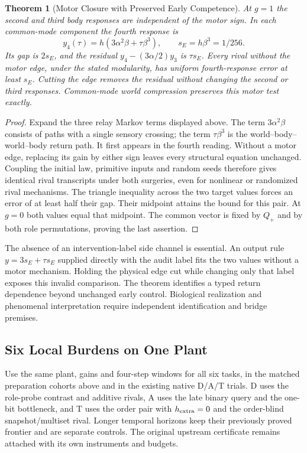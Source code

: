 \documentclass[11pt,a4paper]{article}
\newtheorem{theorem}{Theorem}[section]
\theoremstyle{definition}
\begin{document}
\begin{theorem}[Motor Closure with Preserved Early Competence]\label{thm:bridge-motor-closure}
At $g=1$ the second and third body responses are independent of the motor sign. In each common-mode component the fourth response is
\[
 y_4(\tau)=h(3\alpha^2\beta+\tau\beta^3),\qquad s_E=h\beta^3=1/256.
\]
Its gap is $2s_E$, and the residual $y_4-(3\alpha/2)y_3$ is $\tau s_E$. Every rival without the motor edge, under the stated modularity, has uniform fourth-response error at least $s_E$. Cutting the edge removes the residual without changing the second or third responses. Common-mode world compression preserves this motor test exactly.
\end{theorem}
\begin{proof}
Expand the three relay Markov terms displayed above. The term $3\alpha^2\beta$ consists of paths with a single sensory crossing; the term $\tau\beta^3$ is the world--body--world--body return path. It first appears in the fourth reading. Without a motor edge, replacing its gain by either sign leaves every structural equation unchanged. Coupling the initial law, primitive inputs and random seeds therefore gives identical rival transcripts under both surgeries, even for nonlinear or randomized rival mechanisms. The triangle inequality across the two target values forces an error of at least half their gap. Their midpoint attains the bound for this pair. At $g=0$ both values equal that midpoint. The common vector is fixed by $Q_+$ and by both role permutations, proving the last assertion.
\end{proof}

The absence of an intervention-label side channel is essential. An output rule $y=3s_E+\tau s_E$ supplied directly with the audit label fits the two values without a motor mechanism. Holding the physical edge cut while changing only that label exposes this invalid comparison. The theorem identifies a typed return dependence beyond unchanged early control. Biological realization and phenomenal interpretation require independent identification and bridge premises.

\subsection{Six Local Burdens on One Plant}

Use the same plant, gains and four-step windows for all six tasks, in the matched preparation cohorts above and in the existing native D/A/T trials. D uses the role-probe contrast and additive rivals, A uses the late binary query and the one-bit bottleneck, and T uses the order pair with $h_{\rm extra}=0$ and the order-blind snapshot/multiset rival. Longer temporal horizons keep their previously proved frontier and are separate controls. The original upstream certificate remains attached with its own instruments and budgets.
\end{document}
